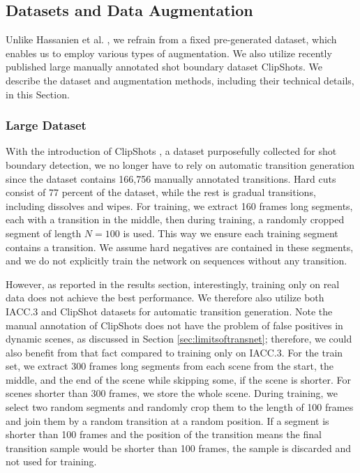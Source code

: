 \subsection{Datasets and Data Augmentation}\label{sec:transnetv2DatasetsAugm}
Unlike Hassanien et al. \cite{Hassanien17}, we refrain from a fixed pre-generated dataset, which enables us to employ various types of augmentation. We also utilize recently published large manually annotated shot boundary dataset ClipShots. We describe the dataset and augmentation methods, including their technical details, in this Section.


\subsubsection{Large Dataset}
With the introduction of ClipShots \cite{Tang2018}, a dataset purposefully collected for shot boundary detection, we no longer have to rely on automatic transition generation since the dataset contains 166,756 manually annotated transitions. Hard cuts consist of 77 percent of the dataset, while the rest is gradual transitions, including dissolves and wipes. For training, we extract 160 frames long segments, each with a transition in the middle, then during training, a randomly cropped segment of length $N=100$ is used. This way we ensure each training segment contains a transition. We assume hard negatives are contained in these segments, and we do not explicitly train the network on sequences without any transition.

However, as reported in the results section, interestingly, training only on real data does not achieve the best performance. We therefore also utilize both IACC.3 and ClipShot datasets for automatic transition generation. Note the manual annotation of ClipShots does not have the problem of false positives in dynamic scenes, as discussed in Section \ref{sec:limitsoftransnet}; therefore, we could also benefit from that fact compared to training only on IACC.3. For the train set, we extract 300 frames long segments from each scene from the start, the middle, and the end of the scene while skipping some, if the scene is shorter. For scenes shorter than 300 frames, we store the whole scene. During training, we select two random segments and randomly crop them to the length of 100 frames and join them by a random transition at a random position. If a segment is shorter than 100 frames and the position of the transition means the final transition sample would be shorter than 100 frames, the sample is discarded and not used for training.

